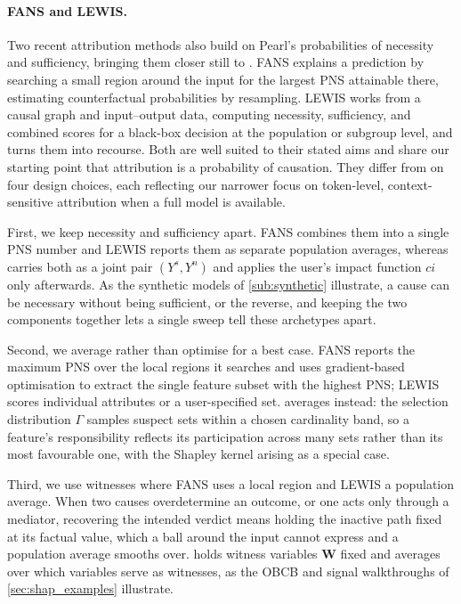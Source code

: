 \paragraph{FANS and LEWIS.}
Two recent attribution methods also build on Pearl's probabilities of necessity and sufficiency, bringing them closer still to \ourapproach. FANS \citep{chenFANS2024} explains a
prediction by searching a small region around the input for the largest PNS attainable there, estimating counterfactual probabilities by resampling. LEWIS \citep{galhotraLewis2021} works from a
causal graph and input--output data, computing necessity, sufficiency, and combined
scores for a black-box decision at the population or subgroup level, and turns them into recourse. Both are well suited to their stated aims and share our starting point
that attribution is a probability of causation. They differ from \ourapproach{} on four
design choices, each reflecting our narrower focus on token-level, context-sensitive
attribution when a full model is available.

First, we keep necessity and sufficiency apart. FANS combines them into a single PNS
number and LEWIS reports them as separate population averages, whereas \ourapproach{}
carries both as a joint pair $(Y^s, Y^n)$ and applies the user's impact function $ci$
only afterwards. As the synthetic models of \cref{sub:synthetic} illustrate, a cause can
be necessary without being sufficient, or the reverse, and keeping the two components
together lets a single sweep tell these archetypes apart.

Second, we average rather than optimise for a best case. FANS reports the maximum PNS over the local regions it searches
and uses gradient-based optimisation to extract the single feature subset with the highest
PNS; LEWIS scores individual attributes or a user-specified set. \ourapproach{} averages
instead: the selection distribution $\Gamma$ samples suspect sets within a chosen
cardinality band, so a feature's responsibility reflects its participation across many
sets rather than its most favourable one, with the Shapley kernel arising as a special
case.

Third, we use witnesses where FANS uses a local region and LEWIS a population average.
When two causes overdetermine an outcome, or one acts only through a mediator, recovering
the intended verdict means holding the inactive path fixed at its factual value, which a
ball around the input cannot express and a population average smooths over. \ourapproach{}
holds witness variables $\mathbf{W}$ fixed and averages over which variables serve as
witnesses, as the OBCB and signal walkthroughs of \cref{sec:shap_examples} illustrate.

